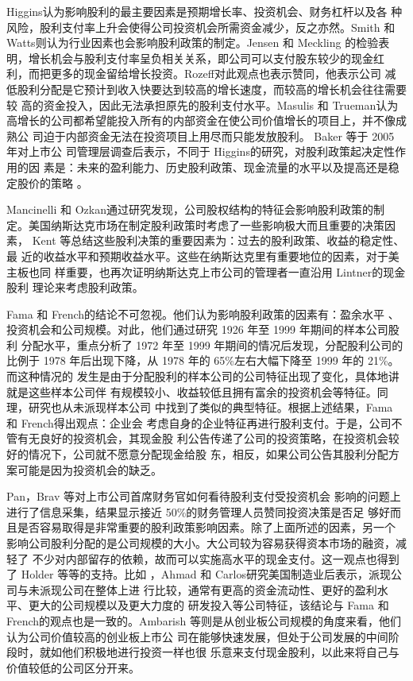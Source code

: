 \documentclass[../main]{subfiles}
\begin{document}
Higgins认为影响股利的最主要因素是预期增长率、投资机会、财务杠杆以及各
种风险，股利支付率上升会使得公司投资机会所需资金减少，反之亦然。Smith 和
Watts则认为行业因素也会影响股利政策的制定。Jensen 和 Meckling
的检验表明，增长机会与股利支付率呈负相关关系，即公司可以支付股东较少的现金红
利，而把更多的现金留给增长投资。Rozeff对此观点也表示赞同，他表示公司
减低股利分配是它预计到收入快要达到较高的增长速度，而较高的增长机会往往需要较
高的资金投入，因此无法承担原先的股利支付水平。Masulis 和 Trueman认为
高增长的公司都希望能投入所有的内部资金在使公司价值增长的项目上，并不像成熟公
司迫于内部资金无法在投资项目上用尽而只能发放股利。 Baker 等于 2005 年对上市公
司管理层调查后表示，不同于 Higgins的研究，对股利政策起决定性作用的因
素是：未来的盈利能力、历史股利政策、现金流量的水平以及提高还是稳定股价的策略
。

Mancinelli 和 Ozkan通过研究发现，公司股权结构的特征会影响股利政策的制
定。美国纳斯达克市场在制定股利政策时考虑了一些影响极大而且重要的决策因素，
Kent 等总结这些股利决策的重要因素为：过去的股利政策、收益的稳定性、最
近的收益水平和预期收益水平。这些在纳斯达克里有重要地位的因素，对于美主板也同
样重要，也再次证明纳斯达克上市公司的管理者一直沿用 Lintner的现金股利
理论来考虑股利政策。

Fama 和 French的结论不可忽视。他们认为影响股利政策的因素有：盈余水平
、投资机会和公司规模。对此，他们通过研究 1926 年至 1999 年期间的样本公司股利
分配水平，重点分析了 1972 年至 1999 年期间的情况后发现，分配股利公司的比例于
1978 年后出现下降，从 1978 年的 65\%左右大幅下降至 1999 年的 21\%。而这种情况的
发生是由于分配股利的样本公司的公司特征出现了变化，具体地讲就是这些样本公司伴
有规模较小、收益较低且拥有富余的投资机会等特征。同理，研究也从未派现样本公司
中找到了类似的典型特征。根据上述结果，Fama 和 French得出观点：企业会
考虑自身的企业特征再进行股利支付。于是，公司不管有无良好的投资机会，其现金股
利公告传递了公司的投资策略，在投资机会较好的情况下，公司就不愿意分配现金给股
东，相反，如果公司公告其股利分配方案可能是因为投资机会的缺乏。

Pan，Brav 等对上市公司首席财务官如何看待股利支付受投资机会
影响的问题上进行了信息采集，结果显示接近 50\%的财务管理人员赞同投资决策是否足
够好而且是否容易取得是非常重要的股利政策影响因素。除了上面所述的因素，另一个
影响公司股利分配的是公司规模的大小。大公司较为容易获得资本市场的融资，减轻了
不少对内部留存的依赖，故而可以实施高水平的现金支付。这一观点也得到了 Holder
等等的支持。比如
，Ahmad 和 Carlos研究美国制造业后表示，派现公司与未派现公司在整体上进
行比较，通常有更高的资金流动性、更好的盈利水平、更大的公司规模以及更大力度的
研发投入等公司特征，该结论与 Fama 和 French的观点也是一致的。Ambarish
等则是从创业板公司规模的角度来看，他们认为公司价值较高的创业板上市公
司在能够快速发展，但处于公司发展的中间阶段时，就如他们积极地进行投资一样也很
乐意来支付现金股利，以此来将自己与价值较低的公司区分开来。
\end{document}
